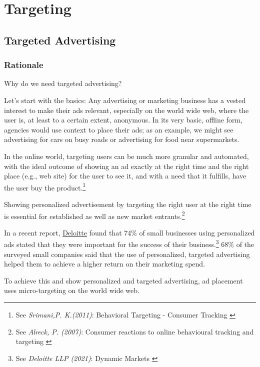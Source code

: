 %
%

\pagebreak
\section{Targeting}

\onehalfspacing

\subsection{Targeted Advertising}

\subsubsection{Rationale}

Why do we need targeted advertising?

Let's start with the basics: Any advertising or marketing business has a vested interest to make their ads relevant, especially on the world wide web, where the user is, at least to a certain extent, anonymous. In its very basic, offline form, agencies would use context to place their ads; as an example, we might see advertising for cars on busy roads or advertising for food near supermarkets.

In the online world, targeting users can be much more granular and automated, with the ideal outcome of showing an ad exactly at the right time and the right place (e.g., web site) for the user to see it, and with a need that it fulfills, have the user buy the product.\footnote{See \textit{Srimani,P. K.(2011)}: Behavioral Targeting - Consumer Tracking \cite{behavioralTracking}}

Showing personalized advertisement by targeting the right user at the right time is essential for established as well as new market entrants.\footnote{See \textit{Alreck, P. (2007)}: Consumer reactions to online behavioural tracking and targeting \cite{consumerReactions}}

In a recent report, \href{https://www2.deloitte.com/de/de.html}{Deloitte} found that 74\% of small businesses using personalized ads stated that they were important for the success of their business.\footnote{See \textit{Deloitte LLP (2021)}: Dynamic Markets \cite{deloitteSmb}} 68\% of the surveyed small companies said that the use of personalized, targeted advertising helped them to achieve a higher return on their marketing spend.

To achieve this and show personalized and targeted advertising, ad placement uses micro-targeting on the world wide web.

